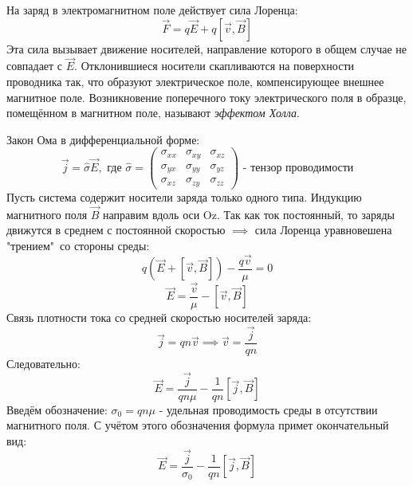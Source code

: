 \documentclass[15pt,a5paper,reqno]{article}
\begin{document}
    На заряд в электромагнитном поле действует сила Лоренца:
    \begin{equation}
        \vec{F} = q\vec{E} + q[\vec{v}, \vec{B}]
    \end{equation}
    Эта сила вызывает движение носителей, направление которого в общем случае не совпадает с $\vec{E}$. Отклонившиеся носители скапливаются на поверхности проводника так, что образуют электрическое поле, компенсирующее внешнее магнитное поле. Возникновение поперечного току электрического поля в образце, помещённом в магнитном поле, называют \textit{эффектом Холла}.

    
    Закон Ома в дифференциальной форме:
    \begin{equation*}
        \vec{j} = \widehat{\sigma}\vec{E},\text{ где } \widehat{\sigma} = 
        \begin{pmatrix}
            \sigma_{xx} & \sigma_{xy} & \sigma_{xz} \\
            \sigma_{yx} & \sigma_{yy} & \sigma_{yz} \\
            \sigma_{xz} & \sigma_{zy} & \sigma_{zz}
        \end{pmatrix}
        \text{ - тензор проводимости}
    \end{equation*}
    Пусть система содержит носители заряда только одного типа. Индукцию магнитного поля $\vec{B}$ направим вдоль оси Oz. Так как ток постоянный, то заряды движутся в среднем с постоянной скоростью $\implies$ сила Лоренца уравновешена "трением"\ со стороны среды:
    \begin{equation*}
        q(\vec{E} + [\vec{v}, \vec{B}]) - \frac{q\vec{v}}{\mu} = 0
    \end{equation*}
    \begin{equation*}
        \vec{E} = \frac{\vec{v}}{\mu} - [\vec{v}, \vec{B}]
    \end{equation*}
    Связь плотности тока со средней скоростью носителей заряда:
    \begin{equation*}
        \vec{j} = qn\vec{v} \implies \vec{v} = \frac{\vec{j}}{qn}
    \end{equation*}
    Следовательно:
    \begin{equation*}
        \vec{E} = \frac{\vec{j}}{qn\mu} - \frac{1}{qn}[\vec{j}, \vec{B}]
    \end{equation*}
    Введём обозначение: $\sigma_0 = qn\mu$ - удельная проводимость среды в отсутствии магнитного поля. С учётом этого обозначения формула примет окончательный вид:
    \begin{equation}\label{vec_E}
        \boxed{\vec{E} = \frac{\vec{j}}{\sigma_0} - \frac{1}{qn}[\vec{j}, \vec{B}]}
    \end{equation}
\end{document}

